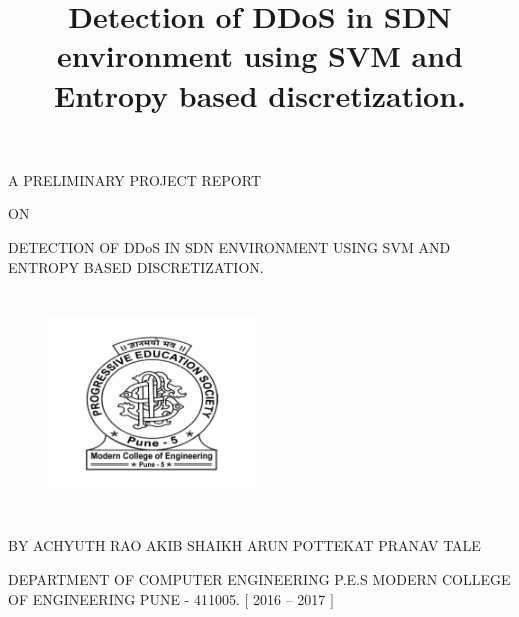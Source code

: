 \documentclass[12pt,a4paper,final]{report}
\title{Detection of DDoS in SDN environment using SVM and Entropy based discretization.}
\begin{document}
\begin{center}
\thispagestyle{empty}
\vspace*{1cm}
A PRELIMINARY PROJECT REPORT
\vspace*{0.75cm}

ON
\vspace*{0.75cm}

\Large
DETECTION OF DDoS IN SDN ENVIRONMENT USING SVM AND ENTROPY  BASED DISCRETIZATION.
\vspace*{0.75cm}

\normalsize
\begin{figure}[h]
\begin{center}
\includegraphics[width=5.5cm, height=6cm]{logo.png}
\end{center}
\end{figure}

\vspace*{0.5cm}
BY
\vspace*{0.35cm}
\linebreak
ACHYUTH RAO
\linebreak
AKIB SHAIKH
\linebreak
ARUN POTTEKAT
\linebreak
PRANAV TALE
\linebreak

\large
\vspace*{0.5cm}
DEPARTMENT OF COMPUTER ENGINEERING
\linebreak
P.E.S MODERN COLLEGE OF ENGINEERING
\linebreak
PUNE - 411005.
\linebreak
$[$ 2016 – 2017 $]$
\end{center}
\newpage

\thispagestyle{empty}
\vspace*{60px}
\underline{\hspace{16cm}}
\vspace*{30px}
\end{document}
